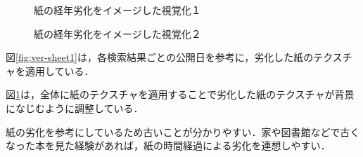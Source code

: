 \begin{figure}[htbp]
  \begin{minipage}{0.5\hsize}
    \begin{center}
    \end{center}
    \caption{紙の経年劣化をイメージした視覚化１}
    \label{fig:ver-sheet1}
  \end{minipage}
  \begin{minipage}{0.5\hsize}
    \begin{center}
    \end{center}
    \caption{紙の経年劣化をイメージした視覚化２}
    \label{fig:ver-sheet2}
  \end{minipage}
\end{figure}

図\ref{fig:ver-sheet1}は，各検索結果ごとの公開日を参考に，劣化した紙のテクスチャを適用している．

図\ref{fig:ver-sheet2}は，全体に紙のテクスチャを適用することで劣化した紙のテクスチャが背景になじむように調整している．

紙の劣化を参考にしているため古いことが分かりやすい．家や図書館などで古くなった本を見た経験があれば，紙の時間経過による劣化を連想しやすい．

